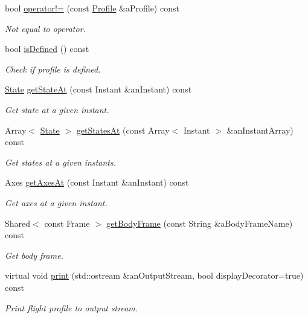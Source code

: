 \begin{DoxyCompactItemize}
bool \hyperlink{classlibrary_1_1astro_1_1flight_1_1_profile_a8e28294340c813a55b3aba76f816d67a}{operator!=} (const \hyperlink{classlibrary_1_1astro_1_1flight_1_1_profile}{Profile} \&a\+Profile) const
\begin{DoxyCompactList}\small\item\em Not equal to operator. \end{DoxyCompactList}\item 
bool \hyperlink{classlibrary_1_1astro_1_1flight_1_1_profile_a577366688800fc4b6f27eb11d64de772}{is\+Defined} () const
\begin{DoxyCompactList}\small\item\em Check if profile is defined. \end{DoxyCompactList}\item 
\hyperlink{classlibrary_1_1astro_1_1flight_1_1profile_1_1_state}{State} \hyperlink{classlibrary_1_1astro_1_1flight_1_1_profile_a7f266d44fe664c8dce12c28067ffdd94}{get\+State\+At} (const Instant \&an\+Instant) const
\begin{DoxyCompactList}\small\item\em Get state at a given instant. \end{DoxyCompactList}\item 
Array$<$ \hyperlink{classlibrary_1_1astro_1_1flight_1_1profile_1_1_state}{State} $>$ \hyperlink{classlibrary_1_1astro_1_1flight_1_1_profile_a20972a5b1104ed335d995c5a02db5db7}{get\+States\+At} (const Array$<$ Instant $>$ \&an\+Instant\+Array) const
\begin{DoxyCompactList}\small\item\em Get states at a given instants. \end{DoxyCompactList}\item 
Axes \hyperlink{classlibrary_1_1astro_1_1flight_1_1_profile_ae23fce614c9d1de3a4e8800eb4e3e03f}{get\+Axes\+At} (const Instant \&an\+Instant) const
\begin{DoxyCompactList}\small\item\em Get axes at a given instant. \end{DoxyCompactList}\item 
Shared$<$ const Frame $>$ \hyperlink{classlibrary_1_1astro_1_1flight_1_1_profile_a0c26ed37c9328fa58a12b723316c485c}{get\+Body\+Frame} (const String \&a\+Body\+Frame\+Name) const
\begin{DoxyCompactList}\small\item\em Get body frame. \end{DoxyCompactList}\item 
virtual void \hyperlink{classlibrary_1_1astro_1_1flight_1_1_profile_a8fadb2b70ff950b2a1f1c0996ced7ad2}{print} (std\+::ostream \&an\+Output\+Stream, bool display\+Decorator=true) const
\begin{DoxyCompactList}\small\item\em Print flight profile to output stream. \end{DoxyCompactList}\end{DoxyCompactItemize}
